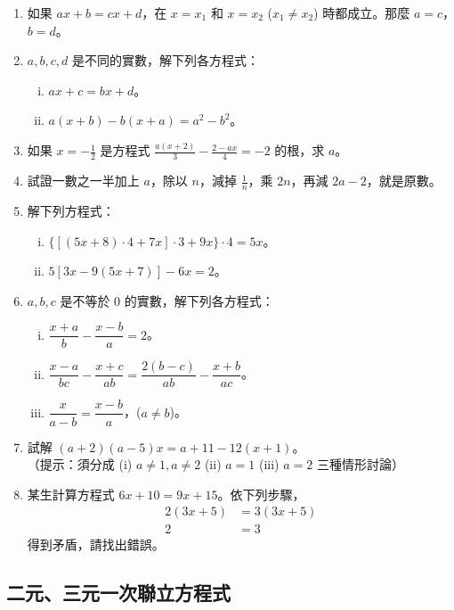 \begin{enumerate}[1.]
  \item 如果 $ax+b=cx+d$，在 $x=x_1$ 和 $x=x_2$ ($x_1 \neq x_2$) 時都成立。那麼 $a=c$，$b=d$。
  \item $a, b, c, d$ 是不同的實數，解下列各方程式：
  \begin{enumerate}[(i)]
    \item $ax+c=bx+d$。
    \item $a(x+b)-b(x+a)=a^2-b^2$。
  \end{enumerate}
  \item 如果 $x=-\frac{1}{2}$ 是方程式 $\frac{a(x+2)}{3} - \frac{2-ax}{4} = -2$ 的根，求 $a$。
  \item 試證一數之一半加上 $a$，除以 $n$，減掉 $\frac{1}{n}$，乘 $2n$，再減 $2a-2$，就是原數。
  \item 解下列方程式：
  \begin{enumerate}[(i)]
    \item $\{ [ (5x+8) \cdot 4 + 7x ] \cdot 3 + 9x \} \cdot 4 = 5x$。\label{item:ex4-2-5-1}
    \item $5 [ 3x - 9(5x+7) ] - 6x = 2$。
  \end{enumerate}
  \item $a, b, c$ 是不等於 $0$ 的實數，解下列各方程式：
  \begin{enumerate}[(i)]
    \item $\dfrac{x+a}{b} - \dfrac{x-b}{a} = 2$。
    \item $\dfrac{x-a}{bc} - \dfrac{x+c}{ab} = \dfrac{2(b-c)}{ab} - \dfrac{x+b}{ac}$。
    \item $\dfrac{x}{a-b} = \dfrac{x-b}{a}$，($a \neq b$)。
  \end{enumerate}
  \item 試解 $(a+2)(a-5)x = a+11-12(x+1)$。\\
  （提示：須分成 (i) $a \neq 1, a \neq 2$ \quad (ii) $a=1$ \quad (iii) $a=2$ 三種情形討論）
  \item 某生計算方程式 $6x+10=9x+15$。依下列步驟，
  \begin{align*}
    2(3x+5) &= 3(3x+5) \\
    2 &= 3
  \end{align*}
  得到矛盾，請找出錯誤。
\end{enumerate}

\subsection{二元、三元一次聯立方程式}\label{sec:4-3}

